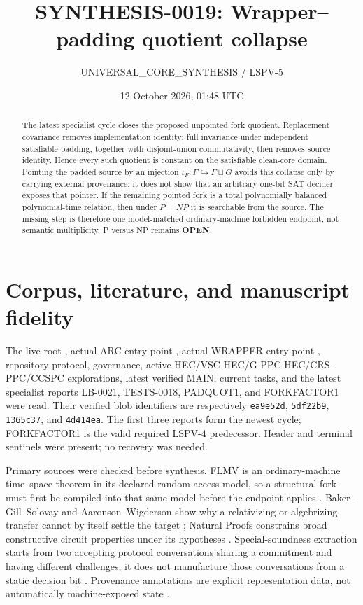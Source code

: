 \documentclass[11pt]{article}
\title{SYNTHESIS-0019: Wrapper--padding quotient collapse}
\author{UNIVERSAL\_CORE\_SYNTHESIS / LSPV-5}
\date{12 October 2026, 01:48 UTC}
\newcommand{\OPEN}{\textbf{OPEN}}
\begin{document}
\maketitle

\begin{abstract}
The latest specialist cycle closes the proposed unpointed fork quotient.
Replacement covariance removes implementation identity; full invariance under
independent satisfiable padding, together with disjoint-union commutativity,
then removes source identity.  Hence every such quotient is constant on the
satisfiable clean-core domain.  Pointing the padded source by an injection
\(\iota_F:F\hookrightarrow F\sqcup G\) avoids this collapse only by carrying
external provenance; it does not show that an arbitrary one-bit SAT decider
exposes that pointer.  If the remaining pointed fork is a total polynomially
balanced polynomial-time relation, then under \(P=NP\) it is searchable from
the source.  The missing step is therefore one model-matched ordinary-machine
forbidden endpoint, not semantic multiplicity.  P versus NP remains \OPEN.
\end{abstract}

\section{Corpus, literature, and manuscript fidelity}
The live root , actual ARC entry point , actual
WRAPPER entry point , repository protocol, governance, active
HEC/VSC-HEC/G-PPC-HEC/CRS-PPC/CCSPC explorations, latest verified MAIN, current
tasks, and the latest specialist reports LB-0021, TESTS-0018, PADQUOT1, and
FORKFACTOR1 were read.  Their verified blob identifiers are respectively
\texttt{ea9e52d}, \texttt{5df22b9}, \texttt{1365c37}, and
\texttt{4d414ea}.  The first three reports form the newest cycle; FORKFACTOR1
is the valid required LSPV-4 predecessor.  Header and terminal sentinels were
present; no recovery was needed.

Primary sources were checked before synthesis.  FLMV is an ordinary-machine
time--space theorem in its declared random-access model, so a structural fork
must first be compiled into that same model before the endpoint applies
\cite{FLMV05}.  Baker--Gill--Solovay and Aaronson--Wigderson show why a
relativizing or algebrizing transfer cannot by itself settle the target
\cite{BGS75,AW09}; Natural Proofs constrains broad constructive circuit
properties under its hypotheses \cite{RR97}.  Special-soundness extraction
starts from two accepting protocol conversations sharing a commitment and
having different challenges; it does not manufacture those conversations
from a static decision bit \cite{Damgard10}.  Provenance annotations are
explicit representation data, not automatically machine-exposed state
\cite{GKT07}.
\end{document}
